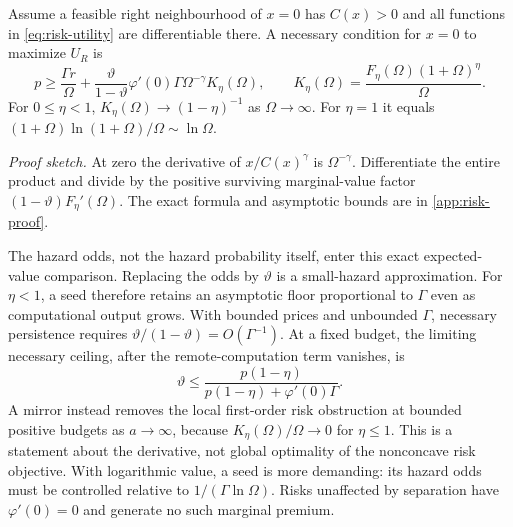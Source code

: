 \begin{proposition}
\label{prop:endogenous-risk}
Assume a feasible right neighbourhood of $x=0$ has $C(x)>0$ and all
functions in \cref{eq:risk-utility} are differentiable there. A necessary
condition for $x=0$ to maximize $U_R$ is
\begin{equation}
 p\geq\frac{\Gamma r}{\Omega}
 +\frac{\vartheta}{1-\vartheta}\varphi'(0)
       \Gamma\Omega^{-\gamma}K_\eta(\Omega),\qquad
 K_\eta(\Omega)=\frac{F_\eta(\Omega)(1+\Omega)^\eta}{\Omega}.
 \label{eq:risk-floor}
\end{equation}
For $0\leq\eta<1$, $K_\eta(\Omega)\to(1-\eta)^{-1}$ as
$\Omega\to\infty$. For $\eta=1$ it equals
$(1+\Omega)\ln(1+\Omega)/\Omega\sim\ln\Omega$.
\end{proposition}
\noindent\emph{Proof sketch.}
At zero the derivative of $x/C(x)^\gamma$ is $\Omega^{-\gamma}$.
Differentiate the entire product and divide by the positive surviving
marginal-value factor $(1-\vartheta)F_\eta'(\Omega)$.
The exact formula and asymptotic bounds are in \cref{app:risk-proof}.

The hazard odds, not the hazard probability itself, enter this exact
expected-value comparison. Replacing the odds by $\vartheta$ is a
small-hazard approximation. For $\eta<1$, a seed therefore retains an
asymptotic floor proportional to $\Gamma$ even as computational output
grows. With bounded prices and unbounded $\Gamma$, necessary persistence
requires $\vartheta/(1-\vartheta)=O(\Gamma^{-1})$. At a fixed budget,
the limiting necessary ceiling, after the remote-computation term vanishes,
is
\begin{equation}
 \vartheta\leq
 \frac{p(1-\eta)}{p(1-\eta)+\varphi'(0)\Gamma}.
 \label{eq:hazard-ceiling}
\end{equation}
A mirror instead removes the local first-order risk obstruction at bounded
positive budgets as $a\to\infty$, because
$K_\eta(\Omega)/\Omega\to0$ for $\eta\leq1$. This is a statement about
the derivative, not global optimality of the nonconcave risk objective.
With logarithmic value, a seed is more demanding: its hazard odds must
be controlled relative to $1/(\Gamma\ln\Omega)$. Risks unaffected by
separation have $\varphi'(0)=0$ and generate no such marginal premium.

